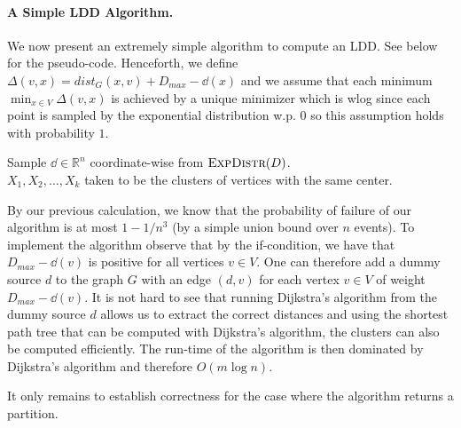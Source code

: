 \paragraph{A Simple LDD Algorithm.} We now present an extremely simple algorithm to compute an LDD.  See below for the pseudo-code.  Henceforth, we define $\Delta(v, x) = dist_G(x, v) + D_{max} - \dd(x)$ and we assume that each minimum $\min_{x \in V} \Delta(v,x)$ is achieved by a unique minimizer which is wlog since each point is sampled by the exponential distribution w.p. $0$ so this assumption holds with probability $1$.

\begin{algorithm}
Sample $\dd \in \mathbb{R}^n$ coordinate-wise from $\textsc{ExpDistr}(D)$.\\
\Return $X_1, X_2, \ldots, X_k$ taken to be the clusters of vertices with the same center.
\caption{$\textsc{ComputeLDD}(G, D)$}
\label{alg:LDD}
\end{algorithm}

By our previous calculation, we know that the probability of failure of our algorithm is at most $1-1/n^3$ (by a simple union bound over $n$ events).  To implement the algorithm observe that by the if-condition, we have that $D_{max} - \dd(v)$ is positive for all vertices $v \in V$.  One can therefore add a dummy source $d$ to the graph $G$ with an edge $(d,v)$ for each vertex $v \in V$ of weight $D_{max} - \dd(v)$. It is not hard to see that running Dijkstra's algorithm from the dummy source $d$ allows us to extract the correct distances and using the shortest path tree that can be computed with Dijkstra's algorithm, the clusters can also be computed efficiently.  The run-time of the algorithm is then dominated by Dijkstra's algorithm and therefore $O(m \log n)$. 

It only remains to establish correctness for the case where the algorithm returns a partition.

